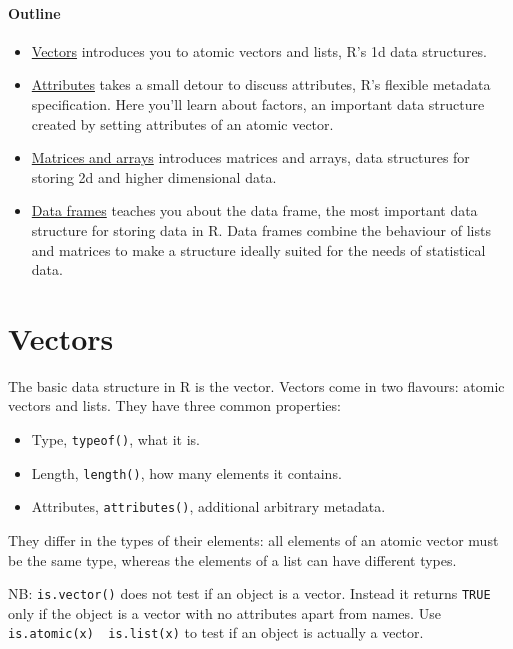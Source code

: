 \hypertarget{outline}{%
\paragraph{Outline}\label{outline}}

\begin{itemize}
\item
  \protect\hyperlink{vectors}{Vectors} introduces you to atomic vectors
  and lists, R's 1d data structures.
\item
  \protect\hyperlink{attributes}{Attributes} takes a small detour to
  discuss attributes, R's flexible metadata specification. Here you'll
  learn about factors, an important data structure created by setting
  attributes of an atomic vector.
\item
  \protect\hyperlink{matrices-and-arrays}{Matrices and arrays}
  introduces matrices and arrays, data structures for storing 2d and
  higher dimensional data.
\item
  \protect\hyperlink{data-frames}{Data frames} teaches you about the
  data frame, the most important data structure for storing data in R.
  Data frames combine the behaviour of lists and matrices to make a
  structure ideally suited for the needs of statistical data.
\end{itemize}

\hypertarget{vectors}{%
\section{Vectors}\label{vectors}}

The basic data structure in R is the vector. Vectors come in two
flavours: atomic vectors and lists. They have three common properties:

\begin{itemize}
\tightlist
\item
  Type, \texttt{typeof()}, what it is.
\item
  Length, \texttt{length()}, how many elements it contains.
\item
  Attributes, \texttt{attributes()}, additional arbitrary metadata.
\end{itemize}

They differ in the types of their elements: all elements of an atomic
vector must be the same type, whereas the elements of a list can have
different types.

NB: \texttt{is.vector()} does not test if an object is a vector. Instead
it returns \texttt{TRUE} only if the object is a vector with no
attributes apart from names. Use
\texttt{is.atomic(x)\ \textbar{}\textbar{}\ is.list(x)} to test if an
object is actually a vector.

